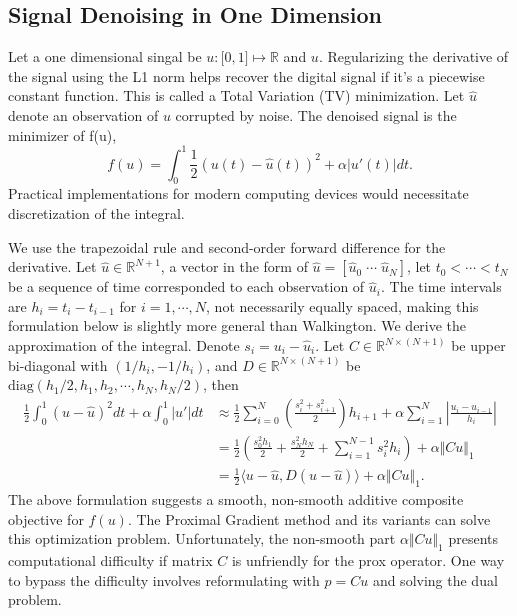 \documentclass[]{article}
\theoremstyle{definition}
\numberwithin{equation}{subsection}
\begin{document}
    \subsection{Signal Denoising in One Dimension}
        Let a one dimensional singal be $u: \mathbb [0, 1]\mapsto \mathbb R$ and $u$. 
        Regularizing the derivative of the signal using the L1 norm helps recover the digital signal if it's a piecewise constant function. 
        This is called a Total Variation (TV) minimization. 
        Let $\hat u$ denote an observation of $u$ corrupted by noise. 
        The denoised signal is the minimizer of f(u),
        \[
            f(u) = \int_0^1 \frac{1}{2} 
            \left(u(t) - \hat u(t)\right)^2 + \alpha |u'(t)|dt. 
        \]
        Practical implementations for modern computing devices would necessitate discretization of the integral. 
        \par
        We use the trapezoidal rule and second-order forward difference for the derivative. 
        Let $\hat u \in \mathbb R^{N+1}$, a vector in the form of $\hat u = [\hat u_0\; \cdots \; \hat u_{N}]$, let $t_0<  \cdots <t_N$ be a sequence of time corresponded to each observation of $\hat u_i$. 
        The time intervals are $h_i = t_{i} - t_{i-1}$ for $i=1, \cdots, N$, not necessarily equally spaced, making this formulation below is slightly more general than Walkington\cite{noel_nesterovs_nodate}. 
        We derive the approximation of the integral. 
        Denote $s_i = u_i - \hat u_i$. 
        Let $C\in \mathbb R^{N\times (N + 1)}$ be upper bi-diagonal with $(1/h_i, -1/h_{i})$, and $D\in \mathbb R^{N \times (N + 1)}$ be $\text{diag}(h_1/2, h_1, h_2, \cdots, h_N, h_N/2)$, then 
        \begin{align*}
            \frac{1}{2}\int_{0}^{1} (u - \hat u)^2 dt + 
            \alpha \int_0^1 |u'| dt
            &\approx
            \frac{1}{2}
            \sum_{i = 0}^{N}
            \left(
                \frac{s_i^2 + s_{i + 1}^2}{2}
            \right)h_{i + 1}
            + 
            \alpha
            \sum_{i = 1}^{N}
            \left|
                \frac{u_{i} - u_{i - 1}}{h_{i}}
            \right|
            \\
            &= \frac{1}{2}\left(
                \frac{s_0^2h_1}{2} + \frac{s_N^2h_N}{2}
                + 
                \sum_{i = 1}^{N - 1}s_i^2 h_i
            \right) + \alpha\Vert Cu\Vert_1
            \\
            &= 
            \frac{1}{2}\langle u - \hat u, D(u - \hat u)\rangle + \alpha \Vert Cu\Vert_1. 
        \end{align*}
    The above formulation suggests a smooth, non-smooth additive composite objective for $f(u)$. 
    The Proximal Gradient method and its variants can solve this optimization problem. 
    Unfortunately, the non-smooth part $\alpha\Vert Cu\Vert_1$ presents computational difficulty if matrix $C$ is unfriendly for the prox operator. 
    One way to bypass the difficulty involves reformulating with $p = Cu$ and solving the dual problem. 
\end{document}

